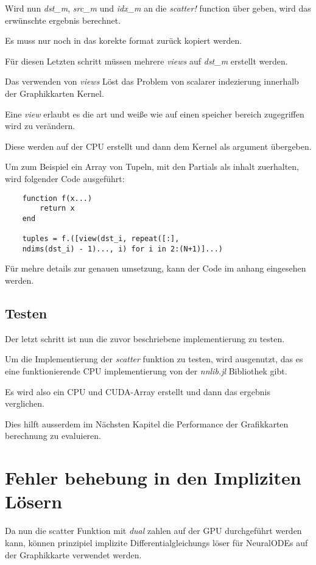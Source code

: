 Wird nun \textit{dst\_m}, \textit{src\_m} und \textit{idx\_m} an die \textit{scatter!} function über
geben, wird das erwünschte ergebnis berechnet. 

Es muss nur noch in das korekte format zurück kopiert werden. 

Für diesen Letzten schritt müssen mehrere \textit{views} auf
\textit{dst_m} erstellt werden.

Das verwenden von \textit{views} Löst das Problem von scalarer indezierung innerhalb der Graphikkarten Kernel. 

Eine \textit{view} erlaubt es die art und weiße wie auf einen speicher bereich zugegriffen wird zu verändern.

Diese werden auf der CPU erstellt und dann dem Kernel als argument übergeben.

Um zum Beispiel ein Array von Tupeln, mit den Partials als inhalt zuerhalten, wird folgender Code ausgeführt:

\begin{lstlisting}
	function f(x...)
		return x
	end
	
	tuples = f.([view(dst_i, repeat([:], 
	ndims(dst_i) - 1)..., i) for i in 2:(N+1)]...)
\end{lstlisting}


Für mehre details zur genauen umsetzung, kann der Code im anhang eingesehen werden.


\subsection{Testen}

Der letzt schritt ist nun die zuvor beschriebene implementierung zu testen.

Um die Implementierung der \textit{scatter} funktion zu testen, wird ausgenutzt,
das es eine funktionierende CPU implementierung von der \textit{nnlib.jl} Bibliothek gibt.

Es wird also ein CPU und CUDA-Array erstellt und dann das ergebnis verglichen.

Dies hilft ausserdem im Nächsten Kapitel die Performance der Grafikkarten berechnung zu evaluieren.

\section{ Fehler behebung in den Impliziten Lösern }

Da nun die scatter Funktion mit \textit{dual} zahlen auf der GPU durchgeführt werden kann, 
können prinzipiel implizite Differentialgleichungs löser für 
NeuralODEs auf der Graphikkarte verwendet werden.

